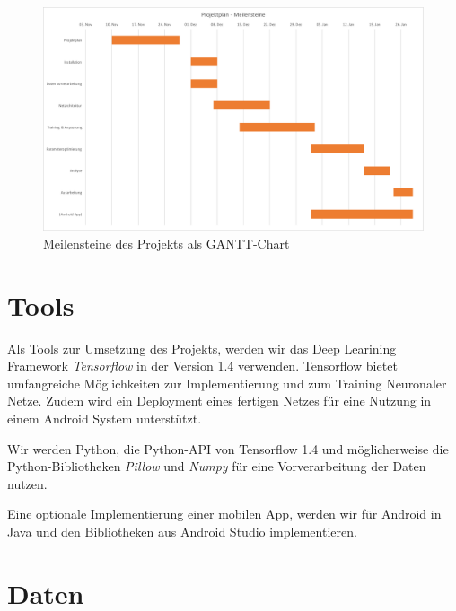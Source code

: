 \documentclass[%
   10pt,              %
   a4paper,           %
   DIV10,             %
]{scrartcl}%
\begin{document}
 \begin{figure}[ht]
	\centering
 \includegraphics[width=\textwidth]{fig/gantt_projektplan}
 \caption{Meilensteine des Projekts als GANTT-Chart}
	\label{fig_gantt}
 \end{figure}

\section*{Tools}
Als Tools zur Umsetzung des Projekts, werden wir das Deep Learining Framework \textit{Tensorflow} \cite{tensorflow2015-whitepaper} in der Version 1.4 verwenden. Tensorflow bietet umfangreiche Möglichkeiten zur Implementierung und zum Training Neuronaler Netze. Zudem wird ein Deployment eines fertigen Netzes für eine Nutzung in einem Android System unterstützt.

Wir werden Python, die Python-API von Tensorflow 1.4 und möglicherweise die Python-Bibliotheken \textit{Pillow} und \textit{Numpy} für eine Vorverarbeitung der Daten nutzen.

Eine optionale Implementierung einer mobilen App, werden wir für Android in Java und den Bibliotheken aus Android Studio implementieren. 

\section*{Daten}
\end{document}
